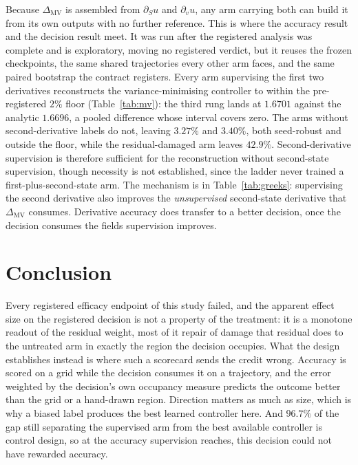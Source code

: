 \documentclass{article}
\begin{document}
Because $\Delta_{\mathrm{MV}}$ is assembled from $\partial_S u$ and $\partial_v u$,
any arm carrying both can build it from its own outputs with no further reference.
This is where the accuracy result and the decision result meet. It was run after the
registered analysis was complete and is exploratory, moving no registered verdict,
but it reuses the frozen checkpoints, the same shared trajectories every other arm
faces, and the same paired bootstrap the contract registers. Every arm supervising
the first two derivatives reconstructs the variance-minimising controller to within
the pre-registered $2\%$ floor (Table~\ref{tab:mv}): the third rung lands at
$1.6701$ against the analytic $1.6696$, a pooled difference whose interval covers
zero. The arms without second-derivative labels do not, leaving $3.27\%$ and
$3.40\%$, both seed-robust and outside the floor, while the residual-damaged arm
leaves $42.9\%$. Second-derivative supervision is therefore sufficient for the
reconstruction without second-state supervision, though necessity is not
established, since the ladder never trained a first-plus-second-state arm. The
mechanism is in Table~\ref{tab:greeks}: supervising the second derivative also
improves the \emph{unsupervised} second-state derivative that $\Delta_{\mathrm{MV}}$
consumes. Derivative accuracy does transfer to a better decision, once the decision
consumes the fields supervision improves.

\section{Conclusion}
\label{sec:conclusion}

Every registered efficacy endpoint of this study failed, and the apparent effect
size on the registered decision is not a property of the treatment: it is a monotone
readout of the residual weight, most of it repair of damage that residual does to
the untreated arm in exactly the region the decision occupies. What the design
establishes instead is where such a scorecard sends the credit wrong. Accuracy is
scored on a grid while the decision consumes it on a trajectory, and the error
weighted by the decision's own occupancy measure predicts the outcome better than
the grid or a hand-drawn region. Direction matters as much as size, which is why a
biased label produces the best learned controller here. And $96.7\%$ of the gap
still separating the supervised arm from the best available controller is control
design, so at the accuracy supervision reaches, this decision could not have
rewarded accuracy.
\end{document}

